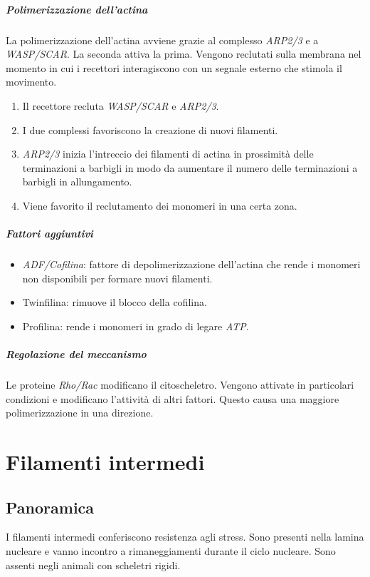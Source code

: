 				\subparagraph{Polimerizzazione dell'actina}
				La polimerizzazione dell'actina avviene grazie al complesso \emph{ARP2/3} e a \emph{WASP/SCAR}.
				La seconda attiva la prima.
				Vengono reclutati sulla membrana nel momento in cui i recettori interagiscono con un segnale esterno che stimola il movimento.
				\begin{multicols}{2}
					\begin{enumerate}
						\item Il recettore recluta \emph{WASP/SCAR} e \emph{ARP2/3}.
						\item I due complessi favoriscono la creazione di nuovi filamenti.
						\item \emph{ARP2/3} inizia l'intreccio dei filamenti di actina in prossimit\`a delle terminazioni a barbigli in modo da aumentare il numero delle terminazioni a barbigli in allungamento.
						\item Viene favorito il reclutamento dei monomeri in una certa zona.
					\end{enumerate}
				\end{multicols}

				\subparagraph{Fattori aggiuntivi}
				\begin{multicols}{2}
					\begin{itemize}
						\item \emph{ADF/Cofilina}: fattore di depolimerizzazione dell'actina che rende i monomeri non disponibili per formare nuovi filamenti.
						\item Twinfilina: rimuove il blocco della cofilina.
						\item Profilina: rende i monomeri in grado di legare \emph{ATP}.
					\end{itemize}
				\end{multicols}

				\subparagraph{Regolazione del meccanismo}
				Le proteine \emph{Rho/Rac} modificano il citoscheletro.
				Vengono attivate in particolari condizioni e modificano l'attivit\`a di altri fattori.
				Questo causa una maggiore polimerizzazione in una direzione.

\section{Filamenti intermedi}

	\subsection{Panoramica}
	I filamenti intermedi conferiscono resistenza agli stress.
	Sono presenti nella lamina nucleare e vanno incontro a rimaneggiamenti durante il ciclo nucleare.
	Sono assenti negli animali con scheletri rigidi.

